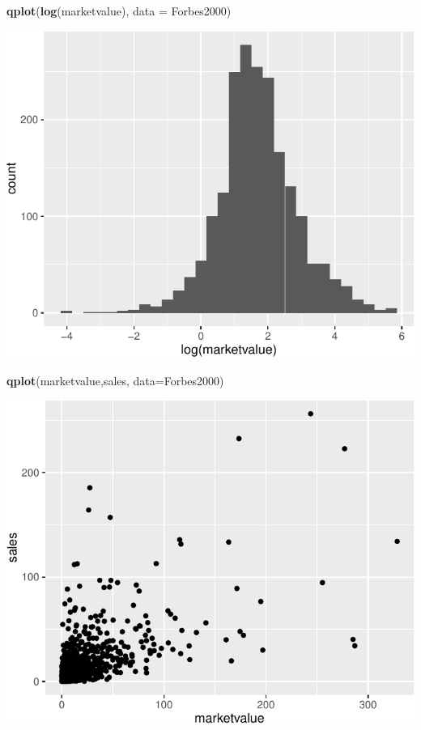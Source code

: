 \documentclass[]{article}
\newenvironment{Shaded}{\begin{snugshade}}{\end{snugshade}}
\newcommand{\KeywordTok}[1]{\textcolor[rgb]{0.13,0.29,0.53}{\textbf{{#1}}}}
\newcommand{\DataTypeTok}[1]{\textcolor[rgb]{0.13,0.29,0.53}{{#1}}}
\newcommand{\NormalTok}[1]{{#1}}
\numberwithin{equation}{section}
\begin{document}
\begin{Shaded}
\begin{Highlighting}[]
\KeywordTok{qplot}\NormalTok{(}\KeywordTok{log}\NormalTok{(marketvalue),  }\DataTypeTok{data =} \NormalTok{Forbes2000)}
\end{Highlighting}
\end{Shaded}

\includegraphics{tema1_files/figure-latex/unnamed-chunk-152-2.pdf}

\begin{Shaded}
\begin{Highlighting}[]
\KeywordTok{qplot}\NormalTok{(marketvalue,sales, }\DataTypeTok{data=}\NormalTok{Forbes2000)}
\end{Highlighting}
\end{Shaded}

\includegraphics{tema1_files/figure-latex/unnamed-chunk-152-3.pdf}
\end{document}
